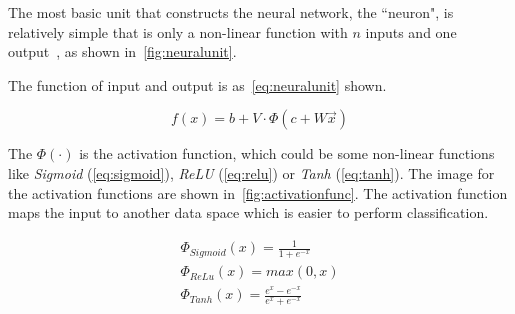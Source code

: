 \begin{spacing}{1.5}
The most basic unit that constructs the neural network, the ``neuron", is relatively simple that is only a non-linear function with $n$ inputs and one output~\cite{bengio2017deep}, as shown in~\autoref{fig:neuralunit}. 

The function of input and output is as~\autoref{eq:neuralunit} shown. 

\begin{equation}
\label{eq:neuralunit}
    f(x)=b+V \cdot \Phi (c+W \vec{x})
\end{equation}

The $\Phi (\cdot)$ is the activation function, which could be some non-linear functions like \textit{Sigmoid} (\autoref{eq:sigmoid}), \textit{ReLU} (\autoref{eq:relu}) or \textit{Tanh} (\autoref{eq:tanh}). The image for the activation functions are shown in~\autoref{fig:activationfunc}. The activation function maps the input to another data space which is easier to perform classification. 



\begin{gather}
   \Phi_{Sigmoid}(x)=\frac{1}{1+e^{-x}} \label{eq:sigmoid}\\
   \Phi_{ReLu}(x)=max(0,x) \label{eq:relu}\\
   \Phi_{Tanh}(x)=\frac{e^{x}-e^{-x}}{e^{x}+e^{-x}} \label{eq:tanh}
\end{gather}


\end{spacing}
